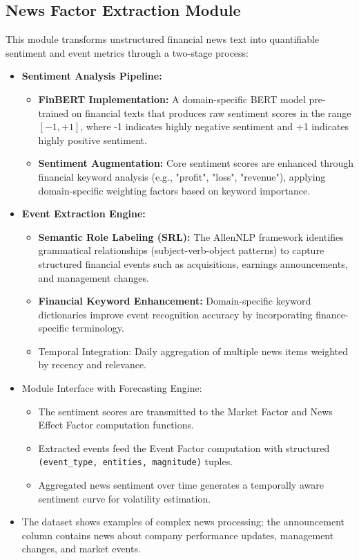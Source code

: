 \documentclass[3p,times,procedia]{elsarticle}
\begin{document}
\subsection{{News Factor Extraction Module}}
This module transforms unstructured financial news text into quantifiable sentiment and event metrics through a two-stage process:
\begin{itemize}
\item \textbf{Sentiment Analysis Pipeline:} 
\begin{itemize}
\item \textbf{FinBERT Implementation:} A domain-specific BERT model pre-trained on financial texts that produces raw sentiment scores in the range $[-1, +1]$, where -1 indicates highly negative sentiment and +1 indicates highly positive sentiment.
\item \textbf{Sentiment Augmentation:} Core sentiment scores are enhanced through financial keyword analysis (e.g., "profit", "loss", "revenue"), applying domain-specific weighting factors based on keyword importance.
\end{itemize}
\item \textbf{Event Extraction Engine:} 
\begin{itemize}
\item \textbf{Semantic Role Labeling (SRL):} The AllenNLP framework identifies grammatical relationships (subject-verb-object patterns) to capture structured financial events such as acquisitions, earnings announcements, and management changes.
\item \textbf{Financial Keyword Enhancement:} Domain-specific keyword dictionaries improve event recognition accuracy by incorporating finance-specific terminology.
\item Temporal Integration: Daily aggregation of multiple news items weighted by recency and relevance.
\end{itemize}
\vspace{0.10cm}
\item Module Interface with Forecasting Engine: 
\begin{itemize}
\item The sentiment scores are transmitted to the Market Factor and News Effect Factor computation functions.
\item Extracted events feed the Event Factor computation with structured \texttt{(event\_type, entities, magnitude)} tuples.
 \item Aggregated news sentiment over time generates a temporally aware sentiment curve for volatility estimation.
\end{itemize}
\item The dataset \cite{FinReportDataset2025} shows examples of complex news processing: the announcement column contains news about company performance updates, management changes, and market events. 
\end{itemize}
\end{document}
